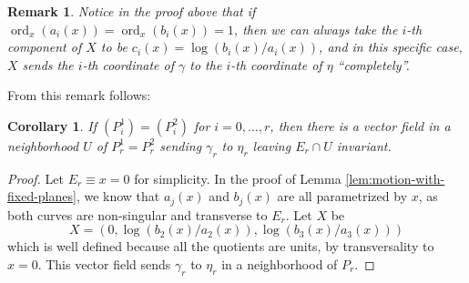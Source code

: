 \documentclass[a4paper,10pt]{amsart}
\newtheorem{remark}{Remark}
\newtheorem{corollary}[theorem]{Corollary}
\DeclareMathOperator{\ord}{ord}
\begin{document}
\begin{remark}
  Notice in the proof above that if $\ord_x(a_i(x)) = \ord_x(b_i(x)) = 1$, then we can always take the $i$-th component of $X$ to be $c_i(x)=\log(b_i(x)/a_i(x))$, and in this specific case, $X$ sends the $i$-th coordinate of $\gamma$ to the $i$-th coordinate of $\eta$ ``completely''.
\end{remark}

From this remark follows:
\begin{corollary}\label{cor:last-divisor}
  If $(P_i^1)=(P_i^2)$ for $i=0,\ldots, r$, then there is a vector field in a neighborhood $U$ of $P_r^1=P_r^2$ sending $\gamma_r$ to $\eta_r$ leaving $E_{r}\cap U$ invariant.
\end{corollary}
\begin{proof}
  Let $E_r\equiv x=0$ for simplicity. In the proof of Lemma \ref{lem:motion-with-fixed-planes}, we know that $a_j(x)$ and $b_j(x)$ are all parametrized by $x$, as both curves are non-singular and transverse to $E_r$. Let $X$ be
  \begin{equation*}
    X = (0, \log(b_2(x)/a_2 (x)), \log(b_3(x)/a_3(x)))
  \end{equation*}
  which is well defined because all the quotients are units, by transversality to $x=0$. This vector field sends $\gamma_r$ to $\eta_r$ in a neighborhood of $P_r$.
\end{proof}
\end{document}
